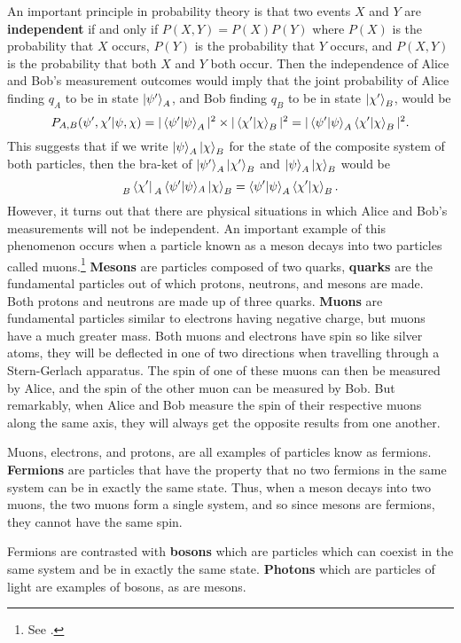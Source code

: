 An important principle in probability theory is that two events $X$ and $Y$ are \textbf{independent} if and only if 
$P(X,Y)=P(X)P(Y)$
where $P(X)$ is the probability that $X$ occurs, $P(Y)$ is the probability that $Y$ occurs, and $P(X,Y)$ is the probability that both $X$ and $Y$ both occur. Then the independence of Alice and Bob's measurement outcomes would imply that the joint probability of Alice finding $q_A$ to be in state $
\ket{\psi'}_A$, and Bob finding $q_B$ to be in state $\ket{\chi'}_B$, would be 
$$P_{A,B}(\psi',\chi'|\psi,\chi)=|\ip{\psi'}{\psi}_A|^2\times|\ip{\chi'}{\chi}_B|^2=|\ip{\psi'}{\psi}_A\ip{\chi'}{\chi}_B|^2.$$
This suggests that if we write $\ket{\psi}_A\ket{\chi}_B$ for the state of the composite system of both particles, then the bra-ket of $\ket{\psi'}_A\ket{\chi'}_B$ and $\ket{\psi}_A\ket{\chi}_B$ 
would be
$$\prescript{}{B}{ \bra*{\chi'}}\prescript{}{A}{\ip*{\psi'}{\psi}}_A\ket*{\chi}_B=\ip{\psi'}{\psi}_A\ip{\chi'}{\chi}_B.
$$
However, it turns out that there are physical situations in which Alice and Bob's measurements will not be independent. An important example of this phenomenon occurs when a particle known as a meson decays into two particles called muons.\footnote{See \cite[p. 242]{Sakurai}.} \textbf{Mesons} are particles composed of two quarks, \textbf{quarks} are the fundamental particles out of which protons, neutrons, and mesons are made. Both protons and neutrons are made up of three quarks. \textbf{Muons} are fundamental particles similar to electrons having negative charge, but muons have a much greater mass. Both muons and electrons have spin so like silver atoms, they will be deflected in one of two directions when travelling through a Stern-Gerlach apparatus. The spin of one of these muons can then be measured by Alice, and the spin of the other muon can be measured by Bob. But remarkably, when Alice and Bob measure the spin of their respective muons along the same axis, they will always get the opposite results from one another. 

Muons, electrons, and protons, are all examples of particles know as fermions. \textbf{Fermions} are particles that have the property that no two fermions in the same system can be in exactly the same state. Thus, when a meson decays into two muons, the two muons form a single system, and so since mesons are fermions, they cannot have the same spin.

Fermions are contrasted with \textbf{bosons} which are particles which can coexist in the same system and be in exactly the same state. \textbf{Photons} which are particles of light are examples of bosons, as are mesons.

